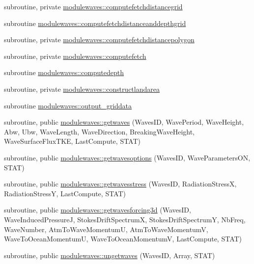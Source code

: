 \begin{DoxyCompactItemize}
\item 
subroutine, private \mbox{\hyperlink{namespacemodulewaves_a945cce4a681b204911670731bf66725a}{modulewaves\+::computefetchdistancegrid}}
\item 
subroutine \mbox{\hyperlink{namespacemodulewaves_a885bbbf547ce705b1cd35ecfebe8df37}{modulewaves\+::computefetchdistanceanddepthgrid}}
\item 
subroutine, private \mbox{\hyperlink{namespacemodulewaves_aae4352dfe2bb084d6d5d956c1bdadea3}{modulewaves\+::computefetchdistancepolygon}}
\item 
subroutine, private \mbox{\hyperlink{namespacemodulewaves_a1ef67144876afbf33cc3bff9a3c88ebd}{modulewaves\+::computefetch}}
\item 
subroutine \mbox{\hyperlink{namespacemodulewaves_a27cdbb0680c11412da65be9051fe9100}{modulewaves\+::computedepth}}
\item 
subroutine, private \mbox{\hyperlink{namespacemodulewaves_a509d19a4e531573684282a3b2e47fb4a}{modulewaves\+::constructlandarea}}
\item 
subroutine \mbox{\hyperlink{namespacemodulewaves_a566d06de3bff651d00d4a28e0e06157b}{modulewaves\+::output\+\_\+griddata}}
\item 
subroutine, public \mbox{\hyperlink{namespacemodulewaves_a12875a6c82df32faa0d9a05dd2d67b1e}{modulewaves\+::getwaves}} (Waves\+ID, Wave\+Period, Wave\+Height, Abw, Ubw, Wave\+Length, Wave\+Direction, Breaking\+Wave\+Height, Wave\+Surface\+Flux\+T\+KE, Last\+Compute, S\+T\+AT)
\item 
subroutine, public \mbox{\hyperlink{namespacemodulewaves_af1623a677ea698d686e5a5faa283eea1}{modulewaves\+::getwavesoptions}} (Waves\+ID, Wave\+Parameters\+ON, S\+T\+AT)
\item 
subroutine, public \mbox{\hyperlink{namespacemodulewaves_a0fa381ad7f743e71a910cb5aafaea3c4}{modulewaves\+::getwavesstress}} (Waves\+ID, Radiation\+StressX, Radiation\+StressY, Last\+Compute, S\+T\+AT)
\item 
subroutine, public \mbox{\hyperlink{namespacemodulewaves_a53569d674a6deea3e1da241680a758b3}{modulewaves\+::getwavesforcing3d}} (Waves\+ID, Wave\+Induced\+PressureJ, Stokes\+Drift\+SpectrumX, Stokes\+Drift\+SpectrumY, Nb\+Freq, Wave\+Number, Atm\+To\+Wave\+MomentumU, Atm\+To\+Wave\+MomentumV, Wave\+To\+Ocean\+MomentumU, Wave\+To\+Ocean\+MomentumV, Last\+Compute, S\+T\+AT)
\item 
subroutine, public \mbox{\hyperlink{namespacemodulewaves_a0c5557cca037fc7fe0c05098f278075d}{modulewaves\+::ungetwaves}} (Waves\+ID, Array, S\+T\+AT)

\end{DoxyCompactItemize}
